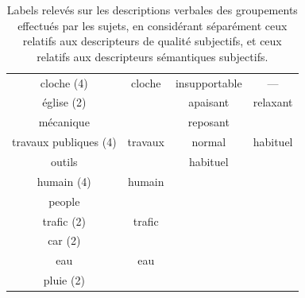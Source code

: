 \begin{table}[t]
\begin{tabular}{cc|cc}
\cline{1-2}
cloche (4)            & cloche                  &  insupportable         & --- \\  \cline{3-4}
église (2)            &                         &  apaisant              & relaxant    \\ 
\cline{1-2}
mécanique             &                         &  reposant              &  \\ \cline{3-4}
travaux publiques (4) & travaux                 &  normal                & habituel     \\ 
outils                &                         &  habituel              & \\  	
\cline{1-2}			                                                             
humain (4)            & humain                  &                        &  \\  
people                &                         &                        & \\       
\cline{1-2}
trafic (2)            & trafic                  &                        & \\
car (2)               &                         &                        &  \\                   
\cline{1-2}
eau                   & eau                     &                        & \\ 
pluie (2)             &                         &                        & \\
\end{tabular}
\vspace{0.5mm}
\caption{Labels relevés sur les descriptions verbales des groupements effectués par les sujets, en considérant séparément ceux relatifs aux descripteurs de qualité subjectifs, et ceux relatifs aux descripteurs sémantiques subjectifs.}
\label{tab:association}
\end{table}

